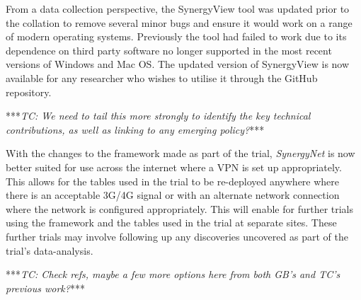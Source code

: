 \documentclass[twocolumn]{svjour3}          %
\begin{document}
From a data collection perspective, the SynergyView tool was updated prior to the collation to remove several minor bugs and ensure it would work on a range of modern operating systems.
Previously the tool had failed to work due to its dependence on third party software no longer supported in the most recent versions of Windows and Mac OS.
The updated version of SynergyView is now available for any researcher who wishes to utilise it through the GitHub repository.



***{\emph{TC: We need to tail this more strongly to identify the key technical contributions, as well as linking to any emerging policy?}}***

With the changes to the framework made as part of the trial, {\emph{SynergyNet}} is now better suited for use across the internet where a VPN is set up appropriately.
This allows for the tables used in the trial to be re-deployed anywhere where there is an acceptable 3G/4G signal or with an alternate network connection where the network is configured appropriately.
This will enable for further trials using the framework and the tables used in the trial at separate sites.
These further trials may involve following up any discoveries uncovered as part of the trial's data-analysis.

***{\emph{TC: Check refs, maybe a few more options here from both GB's and TC's previous work?}}***



\end{document}
